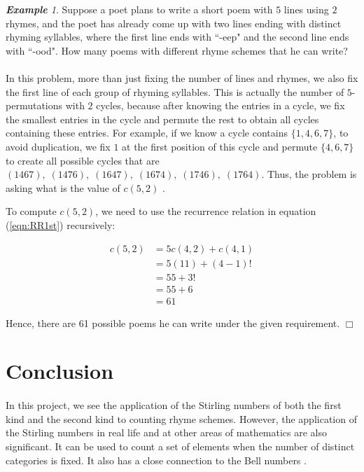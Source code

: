 \documentclass{article}
\theoremstyle{definition}
\theoremstyle{remark}
\theoremstyle{example}
\newtheorem{example}{\textbf{Example}}[section]
\newcommand{\qedwhite}{\hfill \ensuremath{\Box}}
\begin{document}
\begin{example}
    Suppose a poet plans to write a short poem with $5$ lines using $2$ rhymes, and the poet has already come up with two lines ending with distinct rhyming syllables, where the first line ends with ``-eep" and the second line ends with ``-ood". How many poems with different rhyme schemes that he can write?
\end{example}

\paragraph{  }

In this problem, more than just fixing the number of lines and rhymes, we also fix the first line of each group of rhyming syllables. This is actually the number of $5$-permutations with $2$ cycles, because after knowing the entries in a cycle, we fix the smallest entries in the cycle and permute the rest to obtain all cycles containing these entries. For example, if we know a cycle contains $\{1,4,6,7\}$, to avoid duplication, we fix $1$ at the first position of this cycle and permute $\{4,6,7\}$ to create all possible cycles that are $(1467),\; (1476),\; (1647),\; (1674),\; (1746),\; (1764)$. Thus, the problem is asking what is the value of $c(5,2)$ \cite{rogers_rhyming_1981}.

To compute $c(5,2)$, we need to use the recurrence relation in equation (\ref{eqn:RR1st}) recursively:

\begin{align}
    c(5,2) & = 5c(4,2) + c(4,1)\\
    & = 5(11) + (4-1)!\\
    & = 55 + 3!\\
    & = 55 + 6\\
    & = 61
\end{align}

Hence, there are 61 possible poems he can write under the given requirement. \qedwhite

\section{Conclusion}

\paragraph{   }

In this project, we see the application of the Stirling numbers of both the first kind and the second kind to counting rhyme schemes. However, the application of the Stirling numbers in real life and at other areas of mathematics are also significant. It can be used to count a set of elements when the number of distinct categories is fixed. It also has a close connection to the Bell numbers \cite{pollard_c_2003}.

\newpage


\nocite{*}
\end{document}
